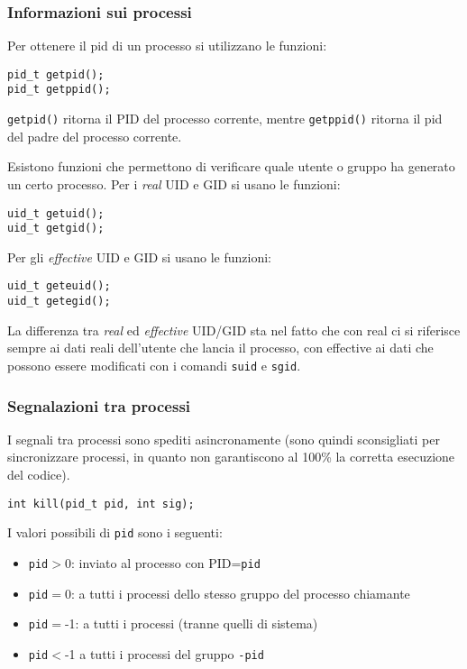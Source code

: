 \documentclass[a4paper]{article}
\begin{document}
\subsubsection{Informazioni sui processi}
Per ottenere il pid di un processo si utilizzano le funzioni:
\begin{verbatim}
pid_t getpid();
pid_t getppid();
\end{verbatim}

\verb|getpid()| ritorna il PID del processo corrente, mentre \verb|getppid()| ritorna il pid del padre del processo corrente.

Esistono funzioni che permettono di verificare quale utente o gruppo ha generato un certo processo.
Per i \textit{real} UID e GID si usano le funzioni:
\begin{verbatim}
uid_t getuid();
uid_t getgid();
\end{verbatim}
Per gli \textit{effective} UID e GID si usano le funzioni:
\begin{verbatim}
uid_t geteuid();
uid_t getegid();
\end{verbatim}

La differenza tra \textit{real} ed \textit{effective} UID/GID sta nel fatto che con real ci si riferisce sempre ai dati reali dell'utente che lancia il processo, con effective ai dati che possono essere modificati con i comandi \verb|suid| e \verb|sgid|.

\subsubsection{Segnalazioni tra processi}
I segnali tra processi sono spediti asincronamente (sono quindi sconsigliati per sincronizzare processi, in quanto non garantiscono al 100\% la corretta esecuzione del codice).
\begin{verbatim}
int kill(pid_t pid, int sig);
\end{verbatim}
I valori possibili di \verb|pid| sono i seguenti:
\begin{itemize}
\item \verb|pid|$>$0: inviato al processo con PID=\verb|pid|
\item \verb|pid|$=$0: a tutti i processi dello stesso gruppo del processo chiamante
\item \verb|pid|$=$-1: a tutti i processi (tranne quelli di sistema)
\item \verb|pid|$<$-1 a tutti i processi del gruppo \verb|-pid|
\end{itemize}
\end{document}
